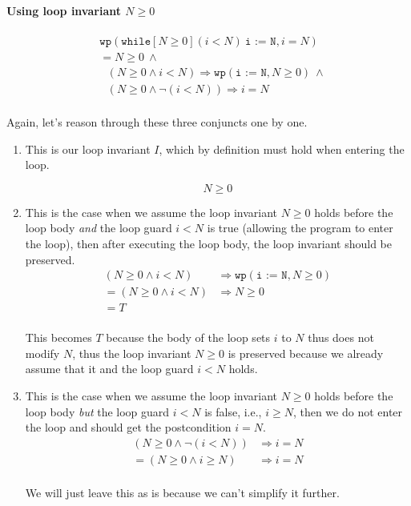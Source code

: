 \documentclass[oneside,11pt,dvipsnames]{book}
\renewcommand{\implies}{\Rightarrow}
\newcommand{\code}[1]{\texttt{#1}}
\begin{document}
\paragraph{Using loop invariant $N \ge 0$}

\begin{equation*}
    \begin{split}
        &\code{wp}(\code{while}[N \ge 0] (i < N ) ~\code{i := N}, i = N)\\
    &= N \ge 0 ~\land  \\
    &~~~ (N \ge 0 \land  i < N) \implies \code{wp}(\code{i := N}, N \ge 0) ~\land \\
    &~~~ (N \ge 0 \land \neg(i < N))  \implies i = N\\ 
    \end{split}
\end{equation*}

Again, let's reason through these three conjuncts one by one.

\begin{enumerate}
    \item         This is our loop invariant $I$, which by definition must hold when entering the loop.

        \[N \ge 0\]

    \item This is the case when we assume the loop invariant $N \ge 0$ holds before the loop body \emph{and} the loop guard $i < N$ is true (allowing the program to enter the loop), then after executing the loop body, the loop invariant should be preserved.
    \begin{equation*}
        \begin{split}
            (N \ge 0 \land  i < N) &\implies \code{wp}(\code{i := N}, N \ge 0)\\
            = (N \ge 0 \land  i < N) &\implies  N \ge 0\\
            = T&\\
        \end{split}
    \end{equation*}

    This becomes $T$ because the body of the loop sets $i$ to $N$ thus does not modify $N$, thus the loop invariant $N \ge 0$ is preserved because we already assume that it and the loop guard $i < N$ holds.

    \item  This is the case when we assume the loop invariant $N \ge 0$ holds before the loop body \emph{but} the loop guard $i < N$ is false, i.e., $i \ge N$, then we do not enter the loop and should get the postcondition $i = N$.
    \begin{equation*}
        \begin{split}
            (N \ge 0 \land \neg(i < N)) &\implies i = N\\
            = (N \ge 0  \land i \ge N)  &\implies i = N\\
        \end{split}
    \end{equation*}

    We will just leave this as is because we can't simplify it further.

\end{enumerate}
\end{document}
